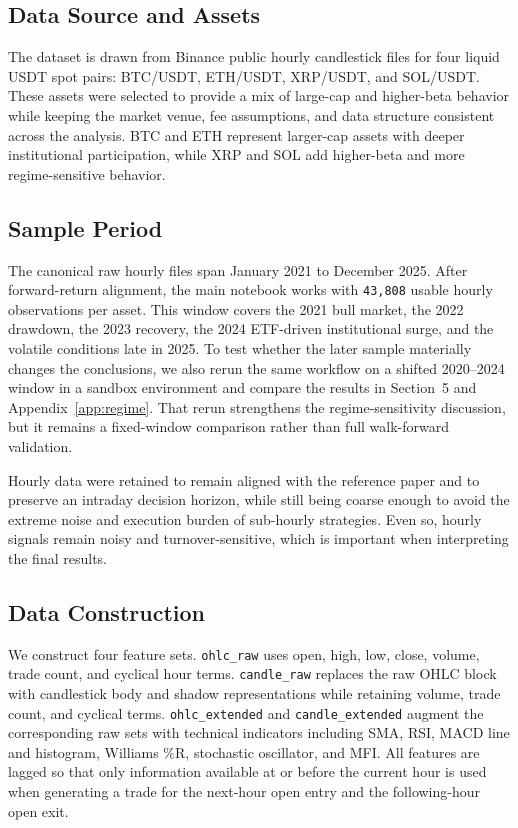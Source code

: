 \documentclass[12pt]{article}
\begin{document}
\subsection{Data Source and Assets}

The dataset is drawn from Binance public hourly candlestick files for four liquid USDT spot pairs: BTC/USDT, ETH/USDT, XRP/USDT, and SOL/USDT. These assets were selected to provide a mix of large-cap and higher-beta behavior while keeping the market venue, fee assumptions, and data structure consistent across the analysis. BTC and ETH represent larger-cap assets with deeper institutional participation, while XRP and SOL add higher-beta and more regime-sensitive behavior.

\subsection{Sample Period}

The canonical raw hourly files span January 2021 to December 2025. After forward-return alignment, the main notebook works with \texttt{43,808} usable hourly observations per asset. This window covers the 2021 bull market, the 2022 drawdown, the 2023 recovery, the 2024 ETF-driven institutional surge, and the volatile conditions late in 2025. To test whether the later sample materially changes the conclusions, we also rerun the same workflow on a shifted 2020--2024 window in a sandbox environment and compare the results in Section~5 and Appendix~\ref{app:regime}. That rerun strengthens the regime-sensitivity discussion, but it remains a fixed-window comparison rather than full walk-forward validation.

Hourly data were retained to remain aligned with the reference paper and to preserve an intraday decision horizon, while still being coarse enough to avoid the extreme noise and execution burden of sub-hourly strategies. Even so, hourly signals remain noisy and turnover-sensitive, which is important when interpreting the final results.

\subsection{Data Construction}

We construct four feature sets. \texttt{ohlc\_raw} uses open, high, low, close, volume, trade count, and cyclical hour terms. \texttt{candle\_raw} replaces the raw OHLC block with candlestick body and shadow representations while retaining volume, trade count, and cyclical terms. \texttt{ohlc\_extended} and \texttt{candle\_extended} augment the corresponding raw sets with technical indicators including SMA, RSI, MACD line and histogram, Williams \%R, stochastic oscillator, and MFI. All features are lagged so that only information available at or before the current hour is used when generating a trade for the next-hour open entry and the following-hour open exit.
\end{document}
